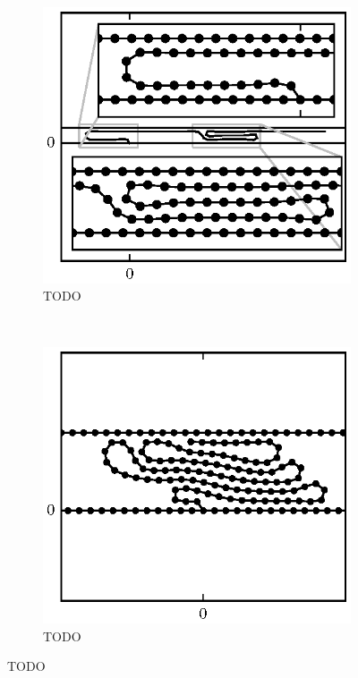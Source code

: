 \begin{figure}
		\begin{subfigure}{.5\textwidth}
			\centering
			\includegraphics{./fig/ch3/push/ref/l15.5_m6.eps}
			\caption{TODO\label{subfig:push_two_folds}}
		\end{subfigure}%
		~
		\begin{subfigure}{.5\textwidth}
			\centering
			\includegraphics{./fig/ch3/push/ref/l19_m0.5.eps}
			\caption{TODO\label{subfig:push_two_folds}}
		\end{subfigure}
		\caption{TODO\label{fig:push_ref_normal}}
	\end{figure}


